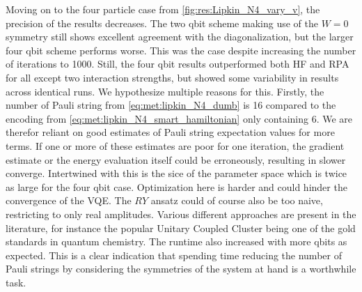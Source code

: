 Moving on to the four particle case from \cref{fig:res:Lipkin_N4_vary_v}, the precision of the results decreases. The two qbit scheme making use of the $W=0$ symmetry still shows excellent agreement with the diagonalization, but the larger four qbit scheme performs worse. This was the case despite increasing the number of iterations to 1000. Still, the four qbit results outperformed both HF and RPA for all except two interaction strengths, but showed some variability in results across identical runs. We hypothesize multiple reasons for this. Firstly, the number of Pauli string from \cref{eq:met:lipkin_N4_dumb} is 16 compared to the encoding from \cref{eq:met:lipkin_N4_smart_hamiltonian} only containing 6. We are therefor reliant on good estimates of Pauli string expectation values for more terms. If one or more of these estimates are poor for one iteration, the gradient estimate or the energy evaluation itself could be erroneously, resulting in slower converge. Intertwined with this is the sice of the parameter space which is twice as large for the four qbit case. Optimization here is harder and could hinder the convergence of the VQE. The $RY$ ansatz could of course also be too naive, restricting to only real amplitudes. Various different approaches are present in the literature, for instance the popular Unitary Coupled Cluster \citep{peruzzoVariationalEigenvalueSolver2014} being one of the gold standards in quantum chemistry. 
The runtime also increased with more qbits as expected. This is a clear indication that spending time reducing the number of Pauli strings by considering the symmetries of the system at hand is a worthwhile task.

